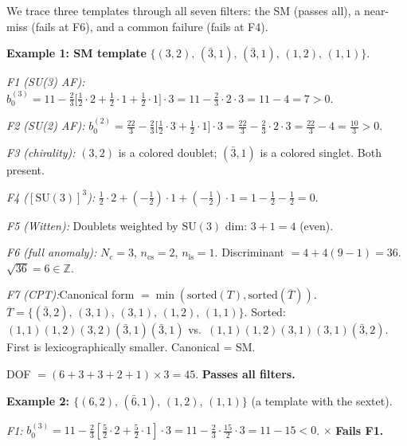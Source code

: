\documentclass[11pt,a4paper]{article}
\theoremstyle{definition}
\newcommand{\SU}{\mathrm{SU}}
\begin{document}
We trace three templates through all seven filters: the SM (passes
all), a near-miss (fails at F6), and a common failure (fails at F4).

\smallskip\noindent\textbf{Example 1: SM template}
$\{(3,2),\, (\bar{3},1),\, (\bar{3},1),\, (1,2),\, (1,1)\}$.

\smallskip\noindent\textit{F1 (SU(3) AF):}\quad
$b_0^{(3)} = 11 - \tfrac{2}{3}\bigl[\tfrac{1}{2}\!\cdot\!2 +
\tfrac{1}{2}\!\cdot\!1 + \tfrac{1}{2}\!\cdot\!1\bigr]\!\cdot\!3
= 11 - \tfrac{2}{3}\!\cdot\!2\!\cdot\!3 = 11 - 4 = 7 > 0$.  \checkmark

\smallskip\noindent\textit{F2 (SU(2) AF):}\quad
$b_0^{(2)} = \tfrac{22}{3} - \tfrac{2}{3}\bigl[\tfrac{1}{2}\!\cdot\!3
+ \tfrac{1}{2}\!\cdot\!1\bigr]\!\cdot\!3
= \tfrac{22}{3} - \tfrac{2}{3}\!\cdot\!2\!\cdot\!3 = \tfrac{22}{3} - 4
= \tfrac{10}{3} > 0$.  \checkmark

\smallskip\noindent\textit{F3 (chirality):}\quad
$(3,2)$ is a colored doublet; $(\bar{3},1)$ is a colored singlet.
Both present.  \checkmark

\smallskip\noindent\textit{F4 ($[\SU(3)]^3$):}\quad
$\tfrac{1}{2}\!\cdot\!2 + (-\tfrac{1}{2})\!\cdot\!1
+ (-\tfrac{1}{2})\!\cdot\!1 = 1 - \tfrac{1}{2} - \tfrac{1}{2} = 0$.
\checkmark

\smallskip\noindent\textit{F5 (Witten):}\quad
Doublets weighted by $\SU(3)$ dim: $3 + 1 = 4$ (even).  \checkmark

\smallskip\noindent\textit{F6 (full anomaly):}\quad
$N_c = 3$, $n_{\mathrm{cs}} = 2$, $n_{\mathrm{ls}} = 1$.
Discriminant $= 4 + 4(9-1) = 36$.  $\sqrt{36} = 6 \in \mathbb{Z}$.
\checkmark

\smallskip\noindent\textit{F7 (CPT):}\quad Canonical form
$= \min(\text{sorted}(T), \text{sorted}(\overline{T}))$.
$\overline{T} = \{(\bar{3},2),\, (3,1),\, (3,1),\, (1,2),\, (1,1)\}$.
Sorted: $(1,1)(1,2)(3,2)(\bar{3},1)(\bar{3},1)$ vs.\
$(1,1)(1,2)(3,1)(3,1)(\bar{3},2)$.  First is lexicographically
smaller.  Canonical = SM.  \checkmark

\smallskip\noindent DOF $= (6+3+3+2+1)\times 3 = 45$.
\textbf{Passes all filters.}

\bigskip
\noindent\textbf{Example 2: $\{(6,2),\, (\bar{6},1),\, (1,2),\, (1,1)\}$}
(a template with the sextet).

\smallskip\noindent\textit{F1:}\quad
$b_0^{(3)} = 11 - \tfrac{2}{3}[\tfrac{5}{2}\!\cdot\!2 +
\tfrac{5}{2}\!\cdot\!1]\!\cdot\!3 = 11 - \tfrac{2}{3}\!\cdot\!
\tfrac{15}{2}\!\cdot\!3 = 11 - 15 < 0$.  $\boldsymbol{\times}$ \textbf{Fails F1.}
\end{document}
